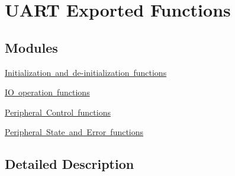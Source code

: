 \hypertarget{group___u_a_r_t___exported___functions}{}\section{U\+A\+RT Exported Functions}
\label{group___u_a_r_t___exported___functions}
\subsection*{Modules}
\begin{DoxyCompactItemize}
\item 
\mbox{\hyperlink{group___u_a_r_t___exported___functions___group1}{Initialization and de-\/initialization functions}}
\item 
\mbox{\hyperlink{group___u_a_r_t___exported___functions___group2}{I\+O operation functions}}
\item 
\mbox{\hyperlink{group___u_a_r_t___exported___functions___group3}{Peripheral Control functions}}
\item 
\mbox{\hyperlink{group___u_a_r_t___exported___functions___group4}{Peripheral State and Error functions}}
\end{DoxyCompactItemize}


\subsection{Detailed Description}
